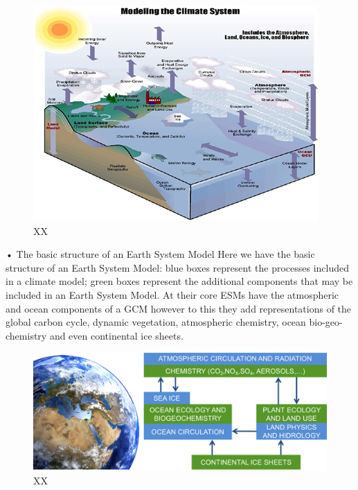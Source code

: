 \documentclass[12pt,oneside]{book}
\begin{document}
\begin{figure}

{\centering \includegraphics[width=0.8\linewidth]{figures/Figure712} 

}

\caption{XX}\label{fig:Earthsystemmodels}
\end{figure}

• The basic structure of an Earth System Model Here we have the basic
structure of an Earth System Model: blue boxes represent the processes
included in a climate model; green boxes represent the additional
components that may be included in an Earth System Model. At their core
ESMs have the atmospheric and ocean components of a GCM however to this
they add representations of the global carbon cycle, dynamic vegetation,
atmospheric chemistry, ocean bio-geo-chemistry and even continental ice
sheets.

\begin{figure}

{\centering \includegraphics[width=0.8\linewidth]{figures/Figure713} 

}

\caption{XX}\label{fig:Earthsystemmodels2}
\end{figure}
\end{document}
